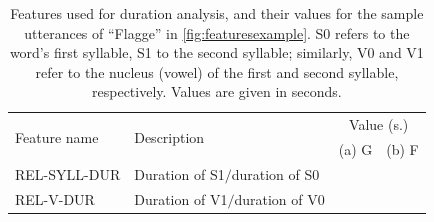 \begin{table}%
		\centering
		\caption[Features used for duration analysis]{Features used for duration analysis, and their values for the sample utterances of ``Flagge'' in \cref{fig:featuresexample}. 
		S0 refers to the word's first syllable, S1 to the second syllable; similarly, V0 and V1 refer to the nucleus (vowel) of the first and second syllable, respectively.
		Values are given in seconds. 
		}
		
%
%		
		\begin{tabularx}{\textwidth}{lXcc}
		\toprule
		\multirow{2}{*}{Feature name} 
									& \multirow{2}{*}{Description}
														& \multicolumn{2}{c}{Value (s.)} \\
	&												&  (a) G		& (b) F \\
		\midrule
		REL-SYLL-DUR 	
			& Duration of S1$/$duration of S0
			& 			& 		\\
		REL-V-DUR 		
			& Duration of V1$/$duration of V0
			& 			& 			\\
		\bottomrule	
		\end{tabularx}
		\label{tab:durationfeatures}
\end{table}



